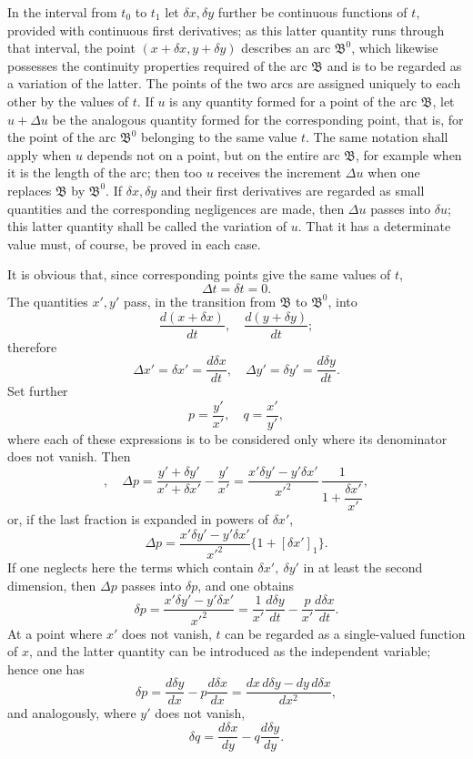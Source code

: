 \documentclass[11pt,a4paper,leqno]{article}
\begin{document}
In the interval from $t_0$ to $t_1$ let $\delta x,\delta y$ further be continuous functions of $t$, provided with continuous first derivatives; as this latter quantity runs through that interval, the point $(x+\delta x,y+\delta y)$ describes an arc $\mathfrak{B}^0$, which likewise possesses the continuity properties required of the arc $\mathfrak{B}$ and is to be regarded as a variation of the latter. The points of the two arcs are assigned uniquely to each other by the values of $t$. If $u$ is any quantity formed for a point of the arc $\mathfrak{B}$, let $u+\Delta u$ be the analogous quantity formed for the corresponding point, that is, for the point of the arc $\mathfrak{B}^0$ belonging to the same value $t$. The same notation shall apply when $u$ depends not on a point, but on the entire arc $\mathfrak{B}$, for example when it is the length of the arc; then too $u$ receives the increment $\Delta u$ when one replaces $\mathfrak{B}$ by $\mathfrak{B}^0$. If $\delta x,\delta y$ and their first
derivatives are regarded as small quantities and the corresponding negligences are made, then $\Delta u$ passes into $\delta u$; this latter quantity shall be called the variation of $u$. That it has a determinate value must, of course, be proved in each case.

It is obvious that, since corresponding points give the same values of $t$,
\[
 \Delta t=\delta t=0.
\]
The quantities $x',y'$ pass, in the transition from $\mathfrak{B}$ to $\mathfrak{B}^0$, into
\[
 \frac{d(x+\delta x)}{dt},\quad \frac{d(y+\delta y)}{dt};
\]
therefore
\[
 \Delta x'=\delta x'=\frac{d\delta x}{dt},\quad
 \Delta y'=\delta y'=\frac{d\delta y}{dt}.
\]
Set further
\[
 p=\frac{y'}{x'},\quad q=\frac{x'}{y'},
\]
where each of these expressions is to be considered only where its denominator does not vanish. Then
\[
 ,\quad
 \Delta p=\frac{y'+\delta y'}{x'+\delta x'}-\frac{y'}{x'}
 =\frac{x'\delta y'-y'\delta x'}{x'^2}\,\frac{1}{1+\dfrac{\delta x'}{x'}},
\]
or, if the last fraction is expanded in powers of $\delta x'$,
\[
 \Delta p=\frac{x'\delta y'-y'\delta x'}{x'^2}\{1+[\delta x']_1\}.
\]
If one neglects here the terms which contain $\delta x',\ \delta y'$ in at least the second dimension, then $\Delta p$ passes into $\delta p$, and one obtains
\[
 \delta p=\frac{x'\delta y'-y'\delta x'}{x'^2}=\frac{1}{x'}\frac{d\delta y}{dt}-\frac{p}{x'}\frac{d\delta x}{dt}.
\]
At a point where $x'$ does not vanish, $t$ can be regarded as a single-valued function of $x$, and the latter quantity can be introduced as the independent variable; hence one has
\[
 \delta p=\frac{d\delta y}{dx}-p\frac{d\delta x}{dx}
 =\frac{dx\,d\delta y-dy\,d\delta x}{dx^2},
\]
and analogously, where $y'$ does not vanish,
\[
 \delta q=\frac{d\delta x}{dy}-q\frac{d\delta y}{dy}.
\]
\end{document}
